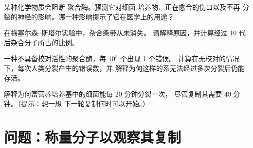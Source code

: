 \begin{exercise}[$\star\star\star$]\label{exo:g11:dna-replication:12}
某种化学物质会阻断  聚合酶。预测它对细菌
培养物、正在愈合的伤口以及不再
分裂的神经的影响。哪一种影响提示了它在医学上的用途？
\end{exercise}

\begin{exercise}[$\star\star\star$]\label{exo:g11:dna-replication:13}
在梅塞尔森–斯塔尔实验中，杂合条带从未消失。
请解释原因，并计算经过
10 代后杂合分子所占的比例。
\end{exercise}

\begin{exercise}[$\star\star\star$]\label{exo:g11:dna-replication:14}
一种不具备校对活性的聚合酶，每 $10^5$ 个出现 1 个错误。
计算在无校对的情况下，每次人类分裂产生的错误数，并
解释为何这样的系无法经过多次分裂后仍能存活。
\end{exercise}

\begin{exercise}[$\star\star\star$]\label{exo:g11:dna-replication:15}
解释为何富营养培养基中的细菌能每 20 分钟分裂一次，
尽管复制其需要 40 分钟。（提示：想一想
下一轮复制何时可以开始。）
\end{exercise}

\section{问题：称量分子以观察其复制}


